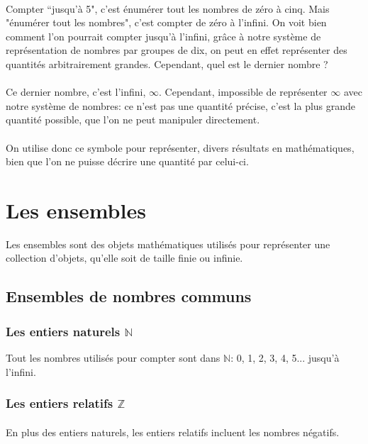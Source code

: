 \documentclass[a4paper]{book}
\begin{document}
    \paragraph{}
    Compter ``jusqu'à 5", c'est énumérer tout les nombres de zéro à cinq. Mais "énumérer tout les nombres", c'est compter de zéro à l'infini. On voit bien comment l'on pourrait compter jusqu'à l'infini, grâce à notre système de représentation de nombres par groupes de dix, on peut en effet représenter des quantités arbitrairement grandes. Cependant, quel est le dernier nombre ?
    \paragraph{}
    Ce dernier nombre, c'est l'infini, $\infty$. Cependant, impossible de représenter $\infty$ avec notre système de nombres: ce n'est pas une quantité précise, c'est la plus grande quantité possible, que l'on ne peut manipuler directement.
    \paragraph{}
    On utilise donc ce symbole pour représenter, divers résultats en mathématiques, bien que l'on ne puisse décrire une quantité par celui-ci.
    
    \section{Les ensembles}
    Les ensembles sont des objets mathématiques utilisés pour représenter une collection d'objets, qu'elle soit de taille finie ou infinie.
    \subsection{Ensembles de nombres communs}
    \subsubsection{Les entiers naturels $\mathds{N}$}
    Tout les nombres utilisés pour compter sont dans $\mathds{N}$: 0, 1, 2, 3, 4, 5... jusqu'à l'infini.
    
    \label{sec:math--obj--sets--Z}
    \subsubsection{Les entiers relatifs $\mathds{Z}$}
    \paragraph{}
    En plus des entiers naturels, les entiers relatifs incluent les nombres négatifs. 
\end{document}
